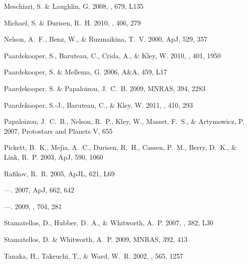 \documentclass[12pt,manuscript,authoryear]{aastex}
\begin{document}
\begin{thebibliography}{48}
{Meschiari}, S. \& {Laughlin}, G. 2008, \apjl, 679, L135

{Michael}, S. \& {Durisen}, R.~H. 2010, \mnras, 406, 279

{Nelson}, A.~F., {Benz}, W., \& {Ruzmaikina}, T.~V. 2000, ApJ, 529, 357

{Paardekooper}, S., {Baruteau}, C., {Crida}, A., \& {Kley}, W. 2010, \mnras,
  401, 1950

{Paardekooper}, S. \& {Mellema}, G. 2006, A\&A, 459, L17

{Paardekooper}, S. \& {Papaloizou}, J.~C.~B. 2009, MNRAS, 394, 2283

{Paardekooper}, S.-J., {Baruteau}, C., \& {Kley}, W. 2011, \mnras, 410, 293

{Papaloizou}, J.~C.~B., {Nelson}, R.~P., {Kley}, W., {Masset}, F.~S., \&
  {Artymowicz}, P. 2007, Protostars and Planets V, 655

{Pickett}, B.~K., {Mej{\'{\i}}a}, A.~C., {Durisen}, R.~H., {Cassen}, P.~M.,
  {Berry}, D.~K., \& {Link}, R.~P. 2003, ApJ, 590, 1060

{Rafikov}, R.~R. 2005, ApJL, 621, L69

---. 2007, ApJ, 662, 642

---. 2009, \apj, 704, 281

{Stamatellos}, D., {Hubber}, D.~A., \& {Whitworth}, A.~P. 2007, \mnras, 382,
  L30

{Stamatellos}, D. \& {Whitworth}, A.~P. 2009, MNRAS, 392, 413

{Tanaka}, H., {Takeuchi}, T., \& {Ward}, W.~R. 2002, \apj, 565, 1257


\end{thebibliography}
\end{document}
